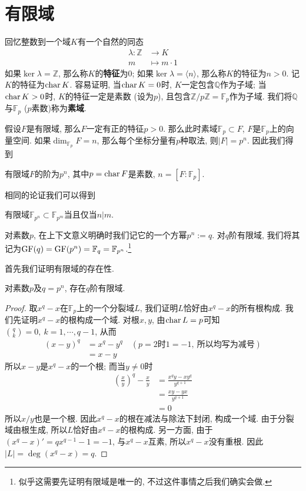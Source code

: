 \section{有限域}
回忆整数到一个域$K$有一个自然的同态
\begin{align*}
    \lambda:\mathbb{Z}&\to K\\
    m&\mapsto m\cdot 1
\end{align*}
如果$\ker\lambda=\mathbb{Z}$, 那么称$K$的\textbf{特征}为$0$;
如果$\ker\lambda=\langle n\rangle$, 那么称$K$的特征为$n>0$.
记$K$的特征为$\operatorname{char}{K}$.
容易证明, 当$\operatorname{char}{K}=0$时, $K$一定包含$\mathbb{Q}$作为子域;
当$\operatorname{char}{K}>0$时, $K$的特征一定是素数 (设为$p$), 且包含$\mathbb{Z}/p\mathbb{Z}=\mathbb{F}_p$作为子域.
我们将$\mathbb{Q}$与$\mathbb{F}_p$ ($p$素数)称为\textbf{素域}.

假设$F$是有限域, 那么$F$一定有正的特征$p>0$.
那么此时素域$\mathbb{F}_p\subset F$, $F$是$\mathbb{F}_p$上的向量空间.
如果$\dim_{\mathbb{F}_p}F=n$, 那么每个坐标分量有$p$种取法, 则$|F|=p^n$.
因此我们得到
\begin{prop}
    有限域$F$的阶为$p^n$, 其中$p=\operatorname{char}{F}$是素数, $n=[F:\mathbb{F}_p]$.
\end{prop}

相同的论证我们可以得到
\begin{prop}\label{finite subfield}
    有限域$\mathbb{F}_{p^n}\subset\mathbb{F}_{p^m}$当且仅当$n|m$.
\end{prop}

\begin{sym}
    对素数$p$, 在上下文意义明确时我们记它的一个方幂$p^n:=q$.
    对$q$阶有限域, 我们将其记为$\operatorname{GF}(q)=\operatorname{GF}(p^n)=\mathbb{F}_q=\mathbb{F}_{p^n}$.\footnote{似乎这需要先证明有限域是唯一的, 不过这件事情之后我们确实会做.}
\end{sym}

首先我们证明有限域的存在性.
\begin{thm}
    对素数$p$及$q=p^n$, 存在$q$阶有限域.
\end{thm}
\begin{proof}
    取$x^q-x$在$\mathbb{F}_p$上的一个分裂域$L$, 我们证明$L$恰好由$x^q-x$的所有根构成.
    我们先证明$x^q-x$的根构成一个域.
    对根$x,y$, 由$\operatorname{char} L=p$可知$\binom{q}{k}=0,\ k=1,\cdots,q-1$, 从而
    \begin{align*}
        (x-y)^q&=x^q-y^q\quad(p=2\text{时}1=-1,\ \text{所以均写为减号})\\
        &=x-y
    \end{align*}
    所以$x-y$是$x^q-x$的一个根;
    而当$y\neq 0$时
    \begin{align*}
        \left(\frac{x}{y}\right)^q-\frac{x}{y}&=\frac{x^qy-xy^q}{y^{q+1}}\\
        &=\frac{xy-yx}{y^{q+1}}\\
        &=0
    \end{align*}
    所以$x/y$也是一个根.
    因此$x^q-x$的根在减法与除法下封闭, 构成一个域.
    由于分裂域由根生成, 所以$L$恰好由$x^q-x$的根构成.
    另一方面, 由于$(x^q-x)'=qx^{q-1}-1=-1$, 与$x^q-x$互素, 所以$x^q-x$没有重根.
    因此$|L|=\deg(x^q-x)=q$.
\end{proof}

